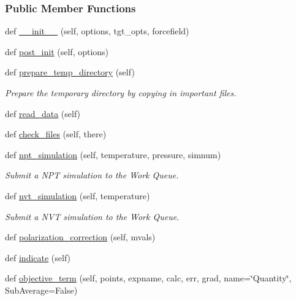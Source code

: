 \subsubsection*{Public Member Functions}
\begin{DoxyCompactItemize}
\item 
def \hyperlink{classsrc_1_1liquid_1_1Liquid_a218eb2c83f267c28251e4c85e9841182}{\+\_\+\+\_\+init\+\_\+\+\_\+} (self, options, tgt\+\_\+opts, forcefield)
\item 
def \hyperlink{classsrc_1_1liquid_1_1Liquid_a8ded8861b18852faa19ce5193691f1f6}{post\+\_\+init} (self, options)
\item 
def \hyperlink{classsrc_1_1liquid_1_1Liquid_a8655401dad963220060fd4dbd4b2c39a}{prepare\+\_\+temp\+\_\+directory} (self)
\begin{DoxyCompactList}\small\item\em Prepare the temporary directory by copying in important files. \end{DoxyCompactList}\item 
def \hyperlink{classsrc_1_1liquid_1_1Liquid_adb6661611a77152b1442392bf4e0c303}{read\+\_\+data} (self)
\item 
def \hyperlink{classsrc_1_1liquid_1_1Liquid_afdbdeb57ce8f506a90711367e9926586}{check\+\_\+files} (self, there)
\item 
def \hyperlink{classsrc_1_1liquid_1_1Liquid_a7ce7650a951da8f4c44c13a55b831719}{npt\+\_\+simulation} (self, temperature, pressure, simnum)
\begin{DoxyCompactList}\small\item\em Submit a N\+PT simulation to the Work Queue. \end{DoxyCompactList}\item 
def \hyperlink{classsrc_1_1liquid_1_1Liquid_aadcc3367e376135de20c3e1dc60d6e1e}{nvt\+\_\+simulation} (self, temperature)
\begin{DoxyCompactList}\small\item\em Submit a N\+VT simulation to the Work Queue. \end{DoxyCompactList}\item 
def \hyperlink{classsrc_1_1liquid_1_1Liquid_a4d42de04975d1fac3a958bb943cc1250}{polarization\+\_\+correction} (self, mvals)
\item 
def \hyperlink{classsrc_1_1liquid_1_1Liquid_a2d50c22b2cf9632ab7bebb415ef5028b}{indicate} (self)
\item 
def \hyperlink{classsrc_1_1liquid_1_1Liquid_ac5a5a9186569e177bf69563dd2b08e80}{objective\+\_\+term} (self, points, expname, calc, err, grad, name=\char`\"{}Quantity\char`\"{}, Sub\+Average=False)

\end{DoxyCompactItemize}
